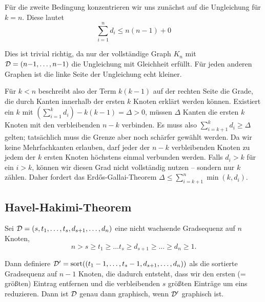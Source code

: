 Für die zweite Bedingung konzentrieren wir uns zunächst auf die Ungleichung für $k = n$.
Diese lautet
\begin{equation}
    \sum_{i=1}^n d_i \le n(n-1) + 0
\end{equation}

Dies ist trivial richtig, da nur der vollständige Graph $K_n$ mit $\mathcal{D} = (n{-}1, \ldots, n{-}1)$ die Ungleichung mit Gleichheit erfüllt.
Für jeden anderen Graphen ist die linke Seite der Ungleichung echt kleiner.

Für $k < n$ beschreibt also der Term $k(k-1)$ auf der rechten Seite die Grade, die durch Kanten innerhalb der ersten $k$ Knoten erklärt werden können.
Existiert ein $k$ mit $(\sum_{i=1}^k d_i) - k(k-1) = \Delta > 0$, müssen $\Delta$ Kanten die ersten $k$ Knoten mit den verbleibenden $n - k$ verbinden.
Es muss also $\sum_{i=k+1}^k d_i \ge \Delta$ gelten; tatsächlich muss die Grenze aber noch schärfer gewählt werden.
Da wir keine Mehrfachkanten erlauben, darf jeder der $n-k$ verbleibenden Knoten zu jedem der $k$ ersten Knoten höchstens einmal verbunden werden.
Falls $d_i > k$ für ein $i > k$, können wir diesen Grad nicht vollständig nutzen -- sondern nur $k$  zählen.
Daher fordert das Erd\H{o}s-Gallai-Theorem $\Delta \le \sum_{i=k+1}^n \min(k, d_i)$.

\subsection{Havel-Hakimi-Theorem}
\begin{theorem}
    Sei $\mathcal{D} = (s, t_1, \ldots, t_s, d_{s+1}, \ldots, d_n)$ eine nicht wachsende Gradsequenz auf $n$ Knoten, \dh
    \begin{equation}
        n > s \ge t_1 \ge \ldots t_s \ge d_{s+1} \ge \ldots \ge d_n \ge 1.
    \end{equation}

    \noindent
    Dann definiere $\mathcal{D}' = \text{sort}((t_1 - 1, \ldots, t_s - 1, d_{s+1}, \ldots, d_n))$ als die sortierte Gradsequenz auf $n-1$ Knoten,
    die dadurch entsteht, dass wir den ersten (= größten) Eintrag entfernen und die verbleibenden $s$ größten Einträge um eins reduzieren.
    Dann ist $\mathcal{D}$ genau dann graphisch, wenn $\mathcal{D}'$ graphisch ist.
\end{theorem}

